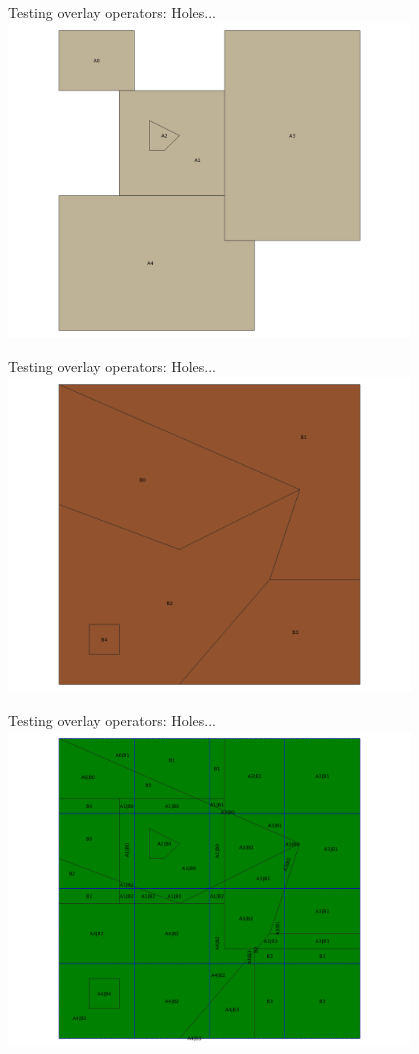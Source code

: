 \documentclass{beamer}
\begin{document}
\begin{frame}{Testing overlay operators: Holes...}
    \centering
	\includegraphics[trim=1cm 0 1cm 0, clip, width=0.8\textwidth]{figures/Holes_A}
\end{frame}
\begin{frame}{Testing overlay operators: Holes...}
    \centering
	\includegraphics[trim=1cm 0 1cm 0, clip, width=0.8\textwidth]{figures/Holes_B}
\end{frame}
\begin{frame}{Testing overlay operators: Holes...}
    \centering
	\includegraphics[trim=1cm 0 1cm 0, clip, width=0.8\textwidth]{figures/Holes_Faces}
\end{frame}
\end{document}
